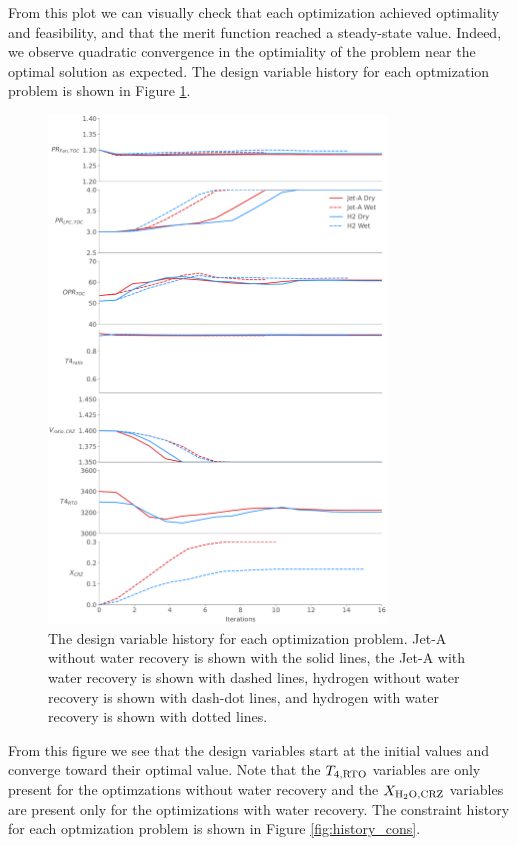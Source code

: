 \documentclass[conf]{new-aiaa}
\begin{document}
From this plot we can visually check that each optimization achieved optimality and feasibility, and that the merit function reached a steady-state value.
Indeed, we observe quadratic convergence in the optimiality of the problem near the optimal solution as expected.
The design variable history for each optmization problem is shown in Figure \ref{fig:history_dvs}.

\begin{figure}[hbt!]
    \centering
    \includegraphics[width=0.8\textwidth]{dvs.pdf}
    \caption{The design variable history for each optimization problem.
        Jet-A without water recovery is shown with the solid lines, the Jet-A with water recovery is shown with dashed lines, hydrogen without water recovery is shown with dash-dot lines, and hydrogen with water recovery is shown with dotted lines.}
    \label{fig:history_dvs}
\end{figure}

From this figure we see that the design variables start at the initial values and converge toward their optimal value.
Note that the $T_{4,\rm{RTO}}$ variables are only present for the optimzations without water recovery and the $X_{\rm{{H_2O},CRZ}}$ variables are present only for the optimizations with water recovery.
The constraint history for each optmization problem is shown in Figure \ref{fig:history_cons}.
\end{document}
